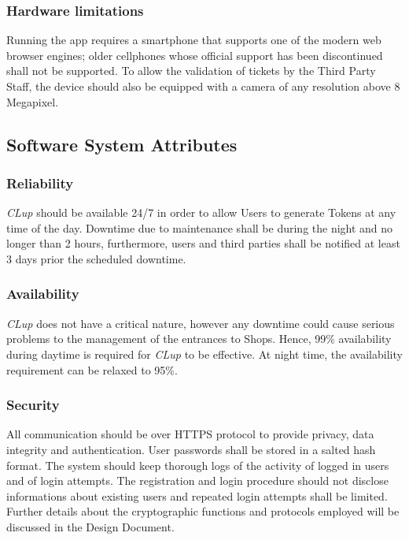\subsubsection{Hardware limitations}
Running the app requires a smartphone that supports one of the modern web browser engines; older cellphones whose official support has been discontinued shall not be supported.
To allow the validation of tickets by the Third Party Staff, the device should also be equipped with a camera of any resolution above 8 Megapixel.

\subsection{Software System Attributes}
\subsubsection{Reliability}
\textit{CLup} should be available 24/7 in order to allow Users to generate Tokens at any time of the day. Downtime due to maintenance shall be during the night and no longer than 2 hours, furthermore, users and third parties shall be notified at least 3 days prior the scheduled downtime.
\subsubsection{Availability}
\emph{CLup} does not have a critical nature, however any downtime could cause serious problems to the management of the entrances to Shops. Hence, 99\% availability during daytime is required for \emph{CLup} to be effective. At night time, the availability requirement can be relaxed to 95\%.
\subsubsection{Security}
All communication should be over HTTPS protocol to provide privacy, data integrity and authentication.
User passwords shall be stored in a salted hash format.
The system should keep thorough logs of the activity of logged in users and of login attempts. The registration and login procedure should not disclose informations about existing users and repeated login attempts shall be limited.
Further details about the cryptographic functions and protocols employed will be discussed in the Design Document.
